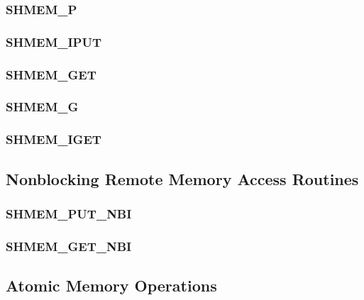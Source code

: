 \documentclass[10pt]{book}
\begin{document}
\subsubsection{\textbf{SHMEM\_P}}\label{subsec:shmem_p}


\subsubsection{\textbf{SHMEM\_IPUT}}\label{subsec:shmem_iput}


\subsubsection{\textbf{SHMEM\_GET}}\label{subsec:shmem_get}


\subsubsection{\textbf{SHMEM\_G}}\label{subsec:shmem_g}


\subsubsection{\textbf{SHMEM\_IGET}}\label{subsec:shmem_iget}


\subsection{Nonblocking Remote Memory Access Routines}\label{sec:rma_nbi}

\subsubsection{\textbf{SHMEM\_PUT\_NBI}}\label{subsec:shmem_put_nbi}


\subsubsection{\textbf{SHMEM\_GET\_NBI}}\label{subsec:shmem_get_nbi}




\subsection{Atomic Memory Operations}\label{sec:amo}

\end{document}
